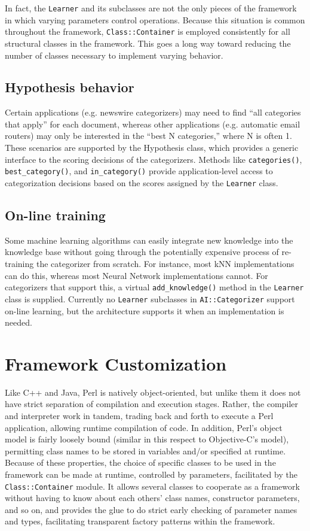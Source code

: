 \documentclass[twocolumn]{article}
\begin{document}
In fact, the \texttt{Learner} and its subclasses are not the only
pieces of the framework in which varying parameters control
operations.  Because this situation is common throughout the
framework, \texttt{Class::Container} is employed consistently for all
structural classes in the framework.  This goes a long way toward
reducing the number of classes necessary to implement varying
behavior.

\subsection*{Hypothesis behavior}
Certain applications (e.g. newswire categorizers) may need to find
``all categories that apply'' for each document, whereas other
applications (e.g. automatic email routers) may only be interested in
the ``best N categories,'' where N is often 1.  These scenarios are
supported by the Hypothesis class, which provides a generic interface
to the scoring decisions of the categorizers.  Methods like
\texttt{categories()}, \texttt{best\_category()}, and
\texttt{in\_category()} provide application-level access to
categorization decisions based on the scores assigned by the
\texttt{Learner} class.

\subsection*{On-line training}
Some machine learning algorithms can easily integrate new knowledge
into the knowledge base without going through the potentially
expensive process of re-training the categorizer from scratch.  For
instance, most kNN implementations can do this, whereas most Neural
Network implementations cannot.  For categorizers that support this, a
virtual \texttt{add\_knowledge()} method in the \texttt{Learner} class
is supplied.  Currently no \texttt{Learner} subclasses in
\texttt{AI::Categorizer} support on-line learning, but the
architecture supports it when an implementation is needed.


\section{Framework Customization}

Like C++ and Java, Perl is natively object-oriented, but unlike them it does not have strict separation of compilation and execution stages.  Rather, the compiler and interpreter work in tandem, trading back and forth to execute a Perl application, allowing runtime compilation of code.  In addition, Perl's object model is fairly loosely bound (similar in this respect to Objective-C's model), permitting class names to be stored in variables and/or specified at runtime.  Because of these properties, the choice of specific classes to be used in the framework can be made at runtime, controlled by parameters, facilitated by the \texttt{Class::Container} module.  It allows several classes to cooperate as a framework without having to know about each others' class names, constructor parameters, and so on, and provides the glue to do strict early checking of parameter names and types, facilitating transparent factory patterns within the framework.
\end{document}
